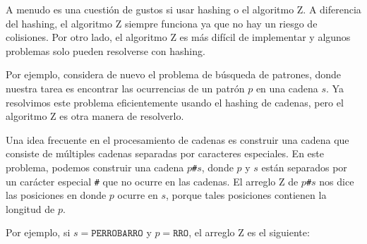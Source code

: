 A menudo es una cuestión de gustos si usar hashing o el algoritmo Z.
A diferencia del hashing, el algoritmo Z siempre funciona ya que no hay
un riesgo de colisiones. Por otro lado, el algoritmo Z es más difícil de
implementar y algunos problemas solo pueden resolverse con hashing.

Por ejemplo, considera de nuevo el problema de búsqueda de patrones,
donde nuestra tarea es encontrar las ocurrencias de un patrón $p$ en
una cadena $s$. Ya resolvimos este problema eficientemente usando el
hashing de cadenas, pero el algoritmo Z es otra manera de resolverlo.

Una idea frecuente en el procesamiento de cadenas es construir una
cadena que consiste de múltiples cadenas separadas por caracteres
especiales. En este problema, podemos construir una cadena
$p$\texttt{\#}$s$, donde $p$ y $s$ están separados por un carácter
especial \texttt{\#} que no ocurre en las cadenas. El arreglo Z de
$p$\texttt{\#}$s$ nos dice las posiciones en donde $p$ ocurre en $s$,
porque tales posiciones contienen la longitud de $p$.

Por ejemplo, si $s=\texttt{PERROBARRO}$ y $p=\texttt{RRO}$, el
arreglo Z es el siguiente:

\begin{center}
\end{center}

